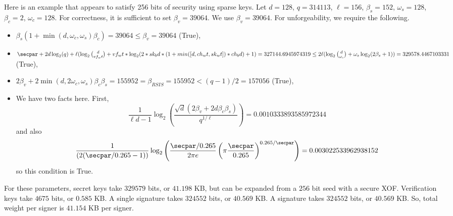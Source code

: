 \begin{example}
Here is an example that appears to satisfy 256 bits of security using sparse keys.
Let $d = 128$, $q = 314113$, $\ell = 156$, $\beta_s = 152$, $\omega_s = 128$, $\beta_c = 2$, $\omega_c = 128$.
For correctness, it is sufficient to set $\beta_v = 39064$. We use $\beta_v = 39064$.
For unforgeability, we require the following.
\begin{itemize}
\item $\beta_s(1+\min(d, \omega_c, \omega_s)\beta_c) = 39064\leq \beta_v = 39064$ (True),
\item $\secpar + 2d \log_2(q) + \ell (\log_2\binom{d}{vf_wt} + vf_wt*\log_2(2*sk_bd*(1+min([d, ch_wt, sk_wt])*ch_bd)+1)= 327144.6945974319\leq 2\ell (\log_2\binom{d}{\omega_s} + \omega_s \log_2(2\beta_s + 1)) = 329578.4467103331$ (True),
\item $2\beta_v + 2\min(d, 2\omega_c, \omega_s)\beta_c \beta_s = 155952 = \beta_{RSIS} = 155952< (q-1)/2 = 157056$ (True),
\item We have two facts here. First, \[\frac{1}{\ell d - 1}\log_2\left(\frac{\sqrt{d}(2\beta_v + 2d\beta_c \beta_s)}{q^{1/\ell}}\right) = 0.0010333893585972344\]and also \[\frac{1}{(2(\secpar/0.265 - 1))}\log_2\left(\frac{\secpar/0.265}{2\pi e}\left(\pi \frac{\secpar}{0.265}\right)^{0.265/\secpar}\right) = 0.003022533962938152\]so this condition is True.
\end{itemize}
For these parameters, secret keys take $329579$ bits, or $41.198$ KB, but can be expanded from a $256$ bit seed with a secure XOF.  Verification keys take $4675$ bits, or $0.585$ KB. A single signature takes $324552$ bits, or $40.569$ KB.  A signature takes $324552$ bits, or $40.569$ KB.  So, total weight per signer is $41.154$ KB per signer.
\end{example}

